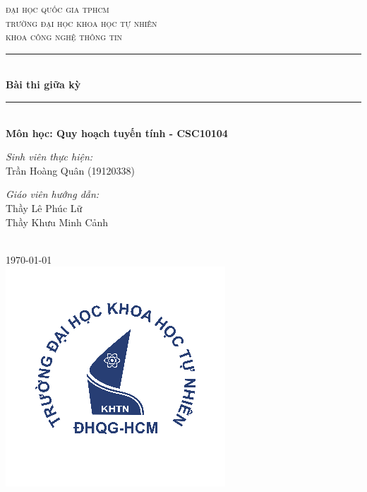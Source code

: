 \documentclass[12pt]{article}
\newcommand{\reportname}{Bài thi giữa kỳ}
\newcommand{\coursename}{Quy hoạch tuyến tính - CSC10104}
\begin{document}
\begin{titlepage}
\newcommand{\HRule}{\rule{\linewidth}{0.5mm}}
\centering

\textsc{\LARGE đại học quốc gia tphcm}\\[1.5cm]
\textsc{\Large trường đại học khoa học tự nhiên}\\[0.5cm]
\textsc{\large khoa công nghệ thông tin}\\[0.5cm]

\HRule \\[0.4cm]
{ 
\huge{\bfseries{\reportname}}\\[0.5cm]
}
\HRule \\[0.5cm]

\textbf{\large Môn học: \coursename}\\[0.5cm]

\begin{minipage}{0.4\textwidth}
\begin{flushleft} \large
\emph{Sinh viên thực hiện:}\\
Trần Hoàng Quân (19120338)
\end{flushleft}
\end{minipage}
\begin{minipage}{0.4\textwidth}
\begin{flushright} \large
\emph{Giáo viên hướng dẫn:} \\
Thầy Lê Phúc Lữ\\
Thầy Khưu Minh Cảnh
\end{flushright}
\end{minipage}\\[2cm]

{\large \today}\\[2cm]

\includegraphics{img/hcmus-logo.png}\\[1cm] 

\vfill
\end{titlepage}
	
\end{document}
